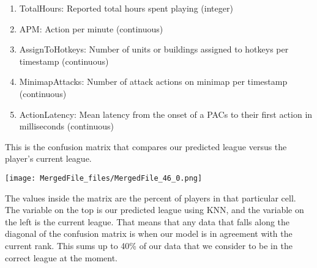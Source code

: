 \documentclass[letterpaper,10pt,english]{/usr/share/sphinx/texinputs/sphinxhowto}
\newenvironment{InvisibleVerbatim}
        {\begin{mdframed}[leftmargin=0.1\linewidth,innerleftmargin=3pt,innerrightmargin=3pt, userdefinedwidth=1\linewidth, linewidth=0pt, linecolor=white, usetwoside=false]}
        {\end{mdframed}}
\begin{document}
\begin{enumerate}[1.]
\item
  TotalHours: Reported total hours spent playing (integer)
\item
  APM: Action per minute (continuous)
\item
  AssignToHotkeys: Number of units or buildings assigned to hotkeys per
  timestamp (continuous)
\item
  MinimapAttacks: Number of attack actions on minimap per timestamp
  (continuous)
\item
  ActionLatency: Mean latency from the onset of a PACs to their first
  action in milliseconds (continuous)
\end{enumerate}


This is the confusion matrix that compares our predicted league versus
the player's current league.

    

        
        

            
                \begin{InvisibleVerbatim}
                \vspace{-0.5\baselineskip}
    \begin{center}
    \texttt{[image: MergedFile\_files/MergedFile\_46\_0.png]}
    \par
    \end{center}
    
            \end{InvisibleVerbatim}
            
        
    
The values inside the matrix are the percent of players in that
particular cell. The variable on the top is our predicted league using
KNN, and the variable on the left is the current league. That means that
any data that falls along the diagonal of the confusion matrix is when
our model is in agreement with the current rank. This sums up to 40\% of
our data that we consider to be in the correct league at the moment.
\end{document}
